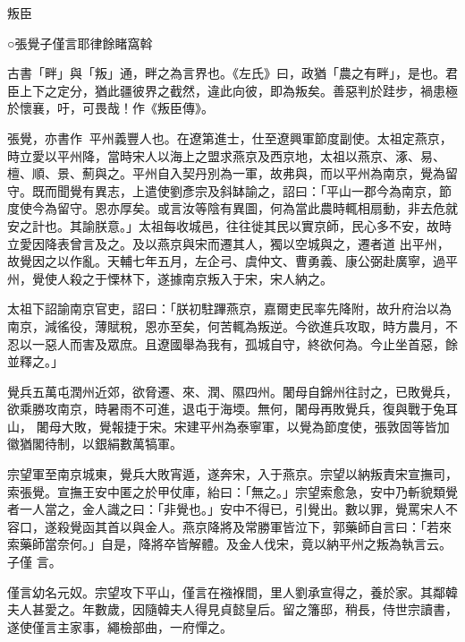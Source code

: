 
\begin{pinyinscope}

 叛臣



 ○張覺子僅言耶律餘睹窩斡



 古書「畔」與「叛」通，畔之為言界也。《左氏》曰，政猶「農之有畔」，是也。君臣上下之定分，猶此疆彼界之截然，違此向彼，即為叛矣。善惡判於跬步，禍患極於懷襄，吁，可畏哉！作《叛臣傳》。



 張覺，亦書作，平州義豐人也。在遼第進士，仕至遼興軍節度副使。太祖定燕京，時立愛以平州降，當時宋人以海上之盟求燕京及西京地，太祖以燕京、涿、易、檀、順、景、薊與之。平州自入契丹別為一軍，故弗與，而以平州為南京，覺為留守。既而聞覺有異志，上遣使劉彥宗及斜缽諭之，詔曰：「平山一郡今為南京，節度使今為留守。恩亦厚矣。或言汝等陰有異圖，何為當此農時輒相扇動，非去危就安之計也。其諭朕意。」太祖每收城邑，往往徙其民以實京師，民心多不安，故時立愛因降表曾言及之。及以燕京與宋而遷其人，獨以空城與之，遷者道
 出平州，故覺因之以作亂。天輔七年五月，左企弓、虞仲文、曹勇義、康公弼赴廣寧，過平州，覺使人殺之于慄林下，遂據南京叛入于宋，宋人納之。



 太祖下詔諭南京官吏，詔曰：「朕初駐蹕燕京，嘉爾吏民率先降附，故升府治以為南京，減徭役，薄賦稅，恩亦至矣，何苦輒為叛逆。今欲進兵攻取，時方農月，不忍以一惡人而害及眾庶。且遼國舉為我有，孤城自守，終欲何為。今止坐首惡，餘並釋之。」



 覺兵五萬屯潤州近郊，欲脅遷、來、潤、隰四州。闍母自錦州往討之，已敗覺兵，欲乘勝攻南京，時暑雨不可進，退屯于海堧。無何，闍母再敗覺兵，復與戰于兔耳山，
 闍母大敗，覺報捷于宋。宋建平州為泰寧軍，以覺為節度使，張敦固等皆加徽猶閣待制，以銀絹數萬犒軍。



 宗望軍至南京城東，覺兵大敗宵遁，遂奔宋，入于燕京。宗望以納叛責宋宣撫司，索張覺。宣撫王安中匿之於甲仗庫，紿曰：「無之。」宗望索愈急，安中乃斬貌類覺者一人當之，金人識之曰：「非覺也。」安中不得已，引覺出。數以罪，覺罵宋人不容口，遂殺覺函其首以與金人。燕京降將及常勝軍皆泣下，郭藥師自言曰：「若來索藥師當奈何。」自是，降將卒皆解體。及金人伐宋，竟以納平州之叛為執言云。子僅
 言。



 僅言幼名元奴。宗望攻下平山，僅言在襁褓間，里人劉承宣得之，養於家。其鄰韓夫人甚愛之。年數歲，因隨韓夫人得見貞懿皇后。留之籓邸，稍長，侍世宗讀書，遂使僅言主家事，繩檢部曲，一府憚之。




\end{pinyinscope}
